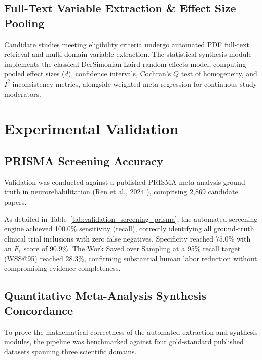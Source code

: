 \documentclass[journal]{IEEEtran}
\begin{document}
\subsection{Full-Text Variable Extraction \& Effect Size Pooling}
Candidate studies meeting eligibility criteria undergo automated PDF full-text retrieval and multi-domain variable extraction. The statistical synthesis module implements the classical DerSimonian-Laird random-effects model, computing pooled effect sizes ($d$), confidence intervals, Cochran's $Q$ test of homogeneity, and $I^2$ inconsistency metrics, alongside weighted meta-regression for continuous study moderators.

\section{Experimental Validation}

\subsection{PRISMA Screening Accuracy}
Validation was conducted against a published PRISMA meta-analysis ground truth in neurorehabilitation (Ren et al., 2024 \cite{ren2024effect}), comprising 2,869 candidate papers.



As detailed in Table~\ref{tab:validation_screening_prisma}, the automated screening engine achieved 100.0\% sensitivity (recall), correctly identifying all ground-truth clinical trial inclusions with zero false negatives. Specificity reached $75.0\%$ with an $F_1$ score of $90.9\%$. The Work Saved over Sampling at a 95\% recall target (WSS@95) reached $28.3\%$, confirming substantial human labor reduction without compromising evidence completeness.

\subsection{Quantitative Meta-Analysis Synthesis Concordance}
To prove the mathematical correctness of the automated extraction and synthesis modules, the pipeline was benchmarked against four gold-standard published datasets spanning three scientific domains.


\end{document}
